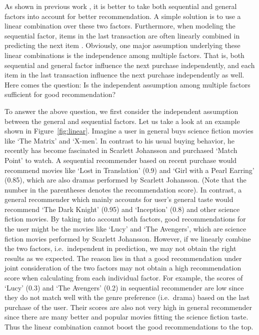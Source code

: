 \documentclass[10pt,journal,compsoc]{IEEEtran}
\begin{document}
As shown in previous work \cite{fpmc}, it is better to take both sequential and general factors into account for better recommendation. A simple solution is to use a linear combination over these two factors. Furthermore, when modeling the sequential factor, items in the last transaction are often linearly combined in predicting the next item \cite{fpmc}. Obviously, one major assumption underlying these linear combinations is the independence among multiple factors. That is, both sequential and general factor influence the next purchase independently, and each item in the last transaction influence the next purchase independently as well. Here comes the question: Is the independent assumption among multiple factors sufficient for good recommendation?

To answer the above question, we first consider the independent assumption between the general and sequential factors. Let us take a look at an example shown in Figure~\ref{fig:linear}. Imagine a user in general buys science fiction movies like `The Matrix' and `X-men'. In contrast to his usual buying behavior, he recently has become fascinated in Scarlett Johansson and purchased `Match Point' to watch. A sequential recommender based on recent purchase would recommend movies like `Lost in Translation' (0.9) and `Girl with a Pearl Earring' (0.85), which are also dramas performed by Scarlett Johansson. (Note that the number in the parentheses denotes the recommendation score). In contrast, a general recommender which mainly accounts for user's general taste would recommend `The Dark Knight' (0.95) and `Inception' (0.8) and other science fiction movies. By taking into account both factors, good recommendations for the user might be the movies like `Lucy' and `The Avengers', which are science fiction movies performed by Scarlett Johansson. However, if we linearly combine the two factors, i.e.~independent in prediction, we may not obtain the right results as we expected.
The reason lies in that a good recommendation under joint consideration of the two factors may not obtain a high recommendation score when calculating from each individual factor. For example, the scores of `Lucy' (0.3) and `The Avengers' (0.2) in sequential recommender are low since they do not match well with the genre preference (i.e.~drama) based on the last purchase of the user. Their scores are also not very high in general recommender since there are many better and popular movies fitting the science fiction taste. Thus the linear combination cannot boost the good recommendations to the top.
\end{document}
